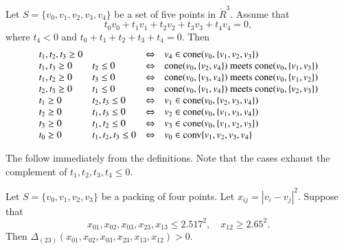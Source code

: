 \begin{tarskidata}
\begin{tarski}
\begin{lemma}
Let $S=\{v_0,v_1,v_2,v_3,v_4\}$ be a set of five points in
$\ring{R}^3$.
Assume that
   $$
   t_0 v_0 + t_1 v_1 + t_2 v_2 + t_3 v_3 + t_4 v_4 = 0,
   $$
where $t_4 < 0$ and $t_0+t_1+t_2+t_3+t_4=0$.
Then
   $$
   \def\lr{\Leftrightarrow}
   \def\m{ \text{ meets } }
   \def\cc{\op{cone}}
   \begin{array}{llcl}
  t_1,t_2,t_3\ge 0  &      &\lr& v_4\in\cc(v_0,\{v_1,v_2,v_3\})\\
  t_1,t_3\ge 0 & t_2\le 0  &\lr& \cc(v_0,\{v_2,v_4\})\m\cc(v_0,\{v_1,v_3\})\\
  t_1,t_2\ge 0 & t_3\le 0  &\lr& \cc(v_0,\{v_3,v_4\})\m\cc(v_0,\{v_1,v_2\})\\
  t_2,t_3\ge 0 & t_1\le 0  &\lr& \cc(v_0,\{v_1,v_4\})\m\cc(v_0,\{v_2,v_3\})\\
  t_1\ge0     & t_2,t_3\le0&\lr& v_1\in\cc(v_0,\{v_2,v_3,v_4\})\\
  t_2\ge0     & t_1,t_3\le0&\lr& v_2\in\cc(v_0,\{v_1,v_3,v_4\})\\
  t_3\ge0     & t_1,t_2\le0&\lr& v_3\in\cc(v_0,\{v_1,v_2,v_3\})\\
  t_0\ge0  &t_1,t_2,t_3\le0&\lr& v_0\in\op{conv}\{v_1,v_2,v_3,v_4\}\\
   \end{array}
   $$
\end{lemma}

\begin{proved}
The follow immediately from the definitions.
Note that the cases exhaust the complement of $t_1,t_2,t_3,t_4\le 0$.
\swallowed\end{proved}
\end{tarski}








\begin{tarski}

\begin{lemma}
Let $S=\{v_0,v_1,v_2,v_3\}$ be a packing of four
points.
Let $x_{ij}=|v_i-v_j|^2$.
 Suppose that
$$
x_{01},x_{02},x_{03},x_{23},x_{13}\le 2.517^2,\quad x_{12}\ge 2.65^2.
$$
Then $\Delta_{(23)}(x_{01},x_{02},x_{03},x_{23},x_{13},x_{12})>0$.
\end{lemma}


\end{tarski}
\end{tarskidata}
